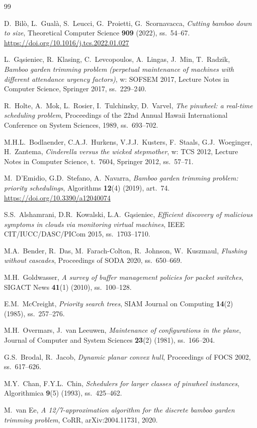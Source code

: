 \documentclass[12pt,a4paper]{article}
\theoremstyle{plain}
\theoremstyle{definition}
\theoremstyle{remark}
\begin{document}
\newpage
\begin{thebibliography}{99}

D.~Bilò, L.~Gualà, S.~Leucci, G.~Proietti, G.~Scornavacca,
\textit{Cutting bamboo down to size},
Theoretical Computer Science \textbf{909} (2022), ss.~54--67.
\url{https://doi.org/10.1016/j.tcs.2022.01.027}

L.~G\k{a}sieniec, R.~Klasing, C.~Levcopoulos, A.~Lingas, J.~Min,
T.~Radzik,
\textit{Bamboo garden trimming problem (perpetual maintenance of machines
with different attendance urgency factors)},
w: SOFSEM 2017, Lecture Notes in Computer Science,
Springer 2017, ss.~229--240.

R.~Holte, A.~Mok, L.~Rosier, I.~Tulchinsky, D.~Varvel,
\textit{The pinwheel: a real-time scheduling problem},
Proceedings of the 22nd Annual Hawaii International Conference
on System Sciences, 1989, ss.~693--702.

M.H.L.~Bodlaender, C.A.J.~Hurkens, V.J.J.~Kusters, F.~Staals,
G.J.~Woeginger, H.~Zantema,
\textit{Cinderella versus the wicked stepmother},
w: TCS 2012, Lecture Notes in Computer Science, t.~7604,
Springer 2012, ss.~57--71.

M.~D'Emidio, G.D.~Stefano, A.~Navarra,
\textit{Bamboo garden trimming problem: priority schedulings},
Algorithms \textbf{12}(4) (2019), art.~74.
\url{https://doi.org/10.3390/a12040074}

S.S.~Alshamrani, D.R.~Kowalski, L.A.~G\k{a}sieniec,
\textit{Efficient discovery of malicious symptoms in clouds via
monitoring virtual machines},
IEEE CIT/IUCC/DASC/PICom 2015, ss.~1703--1710.

M.A.~Bender, R.~Das, M.~Farach-Colton, R.~Johnson, W.~Kuszmaul,
\textit{Flushing without cascades},
Proceedings of SODA 2020, ss.~650--669.

M.H.~Goldwasser,
\textit{A survey of buffer management policies for packet switches},
SIGACT News \textbf{41}(1) (2010), ss.~100--128.

E.M.~McCreight,
\textit{Priority search trees},
SIAM Journal on Computing \textbf{14}(2) (1985), ss.~257--276.

M.H.~Overmars, J.~van Leeuwen,
\textit{Maintenance of configurations in the plane},
Journal of Computer and System Sciences \textbf{23}(2) (1981),
ss.~166--204.

G.S.~Brodal, R.~Jacob,
\textit{Dynamic planar convex hull},
Proceedings of FOCS 2002, ss.~617--626.

M.Y.~Chan, F.Y.L.~Chin,
\textit{Schedulers for larger classes of pinwheel instances},
Algorithmica \textbf{9}(5) (1993), ss.~425--462.

M.~van Ee,
\textit{A 12/7-approximation algorithm for the discrete bamboo
garden trimming problem},
CoRR, arXiv:2004.11731, 2020.

\end{thebibliography}
\end{document}

